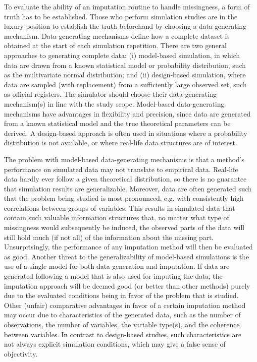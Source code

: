 \documentclass[bimj,fleqn]{w-art}
\begin{document}
To evaluate the ability of an imputation routine to handle missingness, a form of truth has to be established. Those who perform simulation studies are in the luxury position to establish the truth beforehand by choosing a data-generating mechanism. Data-generating mechanisms define how a complete dataset is obtained at the start of each simulation repetition. There are two general approaches to generating complete data: (i) model-based simulation, in which data are drawn from a known statistical model or probability distribution, such as the multivariate normal distribution; and (ii) design-based simulation, where data are sampled (with replacement) from a sufficiently large observed set, such as official registers. The simulator should choose their data-generating mechanism(s) in line with the study scope. Model-based data-generating mechanisms have advantages in flexibility and precision, since data are generated from a known statistical model and the true theoretical parameters can be derived. A design-based approach is often used in situations where a probability distribution is not available, or where real-life data structures are of interest.

The problem with model-based data-generating mechanisms is that a method's performance on simulated data may not translate to empirical data. Real-life data hardly ever follow a given theoretical distribution, so there is no guarantee that simulation results are generalizable. Moreover, data are often generated such that the problem being studied is most pronounced, e.g. with consistently high correlations between groups of variables. This results in simulated data that contain such valuable information structures that, no matter what type of missingness would subsequently be induced, the observed parts of the data will still hold much (if not all) of the information about the missing part. Unsurprisingly, the performance of any imputation method will then be evaluated as good. Another threat to the generalizability of model-based simulations is the use of a single model for both data generation and imputation. If data are generated following a model that is also used for imputing the data, the imputation approach will be deemed good (or better than other methods) purely due to the evaluated conditions being in favor of the problem that is studied. Other (unfair) comparative advantages in favor of a certain imputation method may occur due to characteristics of the generated data, such as the number of observations, the number of variables, the variable type(s), and the coherence between variables. In contrast to design-based studies, such characteristics are not always explicit simulation conditions, which may give a false sense of objectivity.
\end{document}
